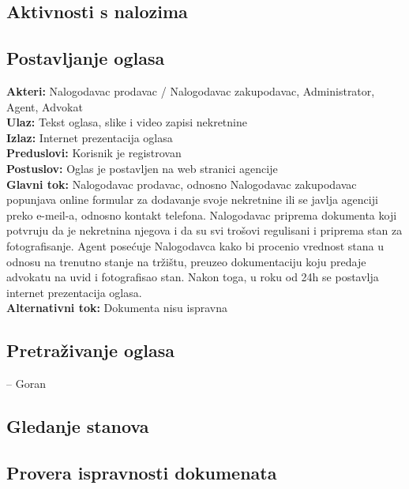\documentclass{article}
\begin{document}
\newpage
\subsection{\bfseries Aktivnosti s nalozima}

\newpage
\subsection{\bfseries Postavljanje oglasa}

{\bfseries Akteri:} Nalogodavac prodavac / Nalogodavac zakupodavac, Administrator, Agent, Advokat\\
{\bfseries Ulaz:} Tekst oglasa, slike i video zapisi nekretnine\\
{\bfseries Izlaz:} Internet prezentacija oglasa\\
{\bfseries Preduslovi:} Korisnik je registrovan\\
{\bfseries Postuslov:} Oglas je postavljen na web stranici agencije\\
{\bfseries Glavni tok:} Nalogodavac prodavac, odnosno Nalogodavac zakupodavac popunjava online formular za dodavanje svoje nekretnine ili se javlja agenciji preko e-meil-a, odnosno kontakt telefona. Nalogodavac priprema dokumenta koji potvr{\dj}uju da je nekretnina njegova i da su svi tro\v{s}ovi regulisani i priprema stan za fotografisanje. Agent pose\'{c}uje Nalogodavca kako bi procenio vrednost stana u odnosu na trenutno stanje na tr\v{z}i\v{s}tu,  preuzeo dokumentaciju koju predaje advokatu na uvid i fotografisao stan. Nakon toga, u roku od 24h se postavlja internet prezentacija oglasa.\\
{\bfseries Alternativni tok:}  Dokumenta nisu ispravna\\ 


\newpage
\subsection{\bfseries Pretra\v{z}ivanje oglasa}
-- Goran 

\newpage
\subsection{\bfseries Gledanje stanova}

\newpage
\subsection{\bfseries Provera ispravnosti dokumenata}
\end{document}
